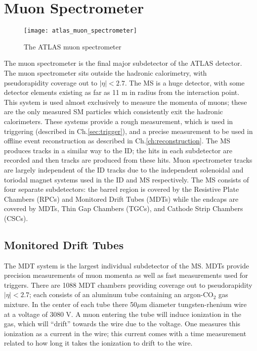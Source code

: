 \section{Muon Spectrometer}
\begin{figure}
\caption{The ATLAS muon spectrometer} \label{fig:atlas_muon_spectrometer}
\texttt{[image: atlas\_muon\_spectrometer]}
\end{figure}

The muon spectrometer is the final major subdetector of the ATLAS detector.
The muon spectrometer sits outside the hadronic calorimetry, with pseudorapidity coverage out to $|\eta| < 2.7$.
The MS is a huge detector, with some detector elements existing as far as 11 m in radius from the interaction point.
This system is used almost exclusively to measure the momenta of muons; these are the only measured SM particles which consistently exit the hadronic calorimeters.
These systems provide a rough measurement, which is used in triggering (described in Ch.\ref{sec:trigger}), and a precise measurement to be used in offline event reconstruction as described in Ch.\ref{ch:reconstruction}.
The MS produces tracks in a similar way to the ID; the hits in each subdetector are recorded and then tracks are produced from these hits.
Muon spectrometer tracks are largely independent of the ID tracks due to the independent solenoidal and toriodal magnet systems used in the ID and MS respectively.
The MS consists of four separate subdetectors: the barrel region is covered by the Resistive Plate Chambers (RPCs) and Monitored Drift Tubes (MDTs) while the endcaps are covered by MDTs, Thin Gap Chambers (TGCs), and Cathode Strip Chambers (CSCs).

\subsection{Monitored Drift Tubes}

The MDT system is the largest individual subdetector of the MS.
MDTs provide precision measurements of muon momenta as well as fast measurements used for triggers.
There are 1088 MDT chambers providing coverage out to pseudorapidity $|\eta| < 2.7 $; each consists of an aluminum tube containing an argon-CO$_2$ gas mixture.
In the center of each tube there 50$\mu$m diameter tungsten-rhenium wire at a voltage of 3080 V.
A muon entering the tube will induce ionization in the gas, which will ``drift'' towards the wire due to the voltage.
One measures this ionization as a current in the wire; this current comes with a time measurement related to how long it takes the ionization to drift to the wire.

